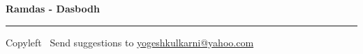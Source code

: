 %


\usepackage{polyglossia}
\setdefaultlanguage{sanskrit}

\usepackage{fontspec}
\setmainfont{Segoe UI}
\newfontfamily{}
\newfontfamily{}
\graphicspath{{images/}}


\raggedright
\footnotesize


\begin{center}
\Large{\textbf{Ramdas - Dasbodh}}  
\end{center}


\begin{multicols}{3}

\end{multicols}

\rule{\linewidth}{0.25pt}
\scriptsize
Copyleft \textcopyleft\  Send suggestions to 
\href{http://www.yogeshkulkarni.com}{yogeshkulkarni@yahoo.com}


